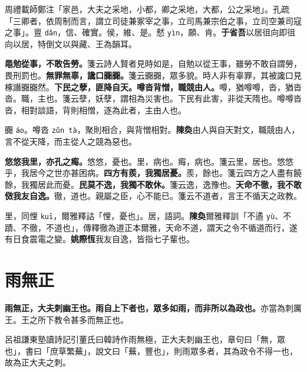 \begin{quoting}周禮載師鄭注「家邑，大夫之采地，小都，卿之采地，大都，公之采地」。孔疏「三卿者，依周制而言，謂立司徒兼冢宰之事，立司馬兼宗伯之事，立司空兼司寇之事」。亶 \texttt{dǎn}，信、確實。侯，維、是。憖 \texttt{yìn}，願、肯。\textbf{于省吾}以居徂向即徂向以居，特倒文以與藏、王為韻耳。\end{quoting}

\textbf{黽勉從事，不敢告勞。}{\footnotesize 箋云詩人賢者見時如是，自勉以從王事，雖勞不敢自謂勞，畏刑罰也。}\textbf{無罪無辜，讒口嚻嚻。}{\footnotesize 箋云嚻嚻，眾多貌。時人非有辜罪，其被讒口見椓譖嚻嚻然。}\textbf{下民之孽，匪降自天。噂沓背憎，職競由人。}{\footnotesize 噂，猶噂噂，沓，猶沓沓。職，主也。箋云孽，妖孽，謂相為災害也。下民有此害，非從天隋也。噂噂沓沓，相對談語，背則相憎，逐為此者，主由人也。}

\begin{quoting}嚻 \texttt{áo}。噂沓 \texttt{zǔn tà}，聚則相合，與背憎相對。\textbf{陳奐}由人與自天對文，職競由人，言不從天降，而主從人之競為惡也。\end{quoting}

\textbf{悠悠我里，亦孔之痗。}{\footnotesize 悠悠，憂也。里，病也。痗，病也。箋云里，居也。悠悠乎，我居今之世亦甚困病。}\textbf{四方有羨，我獨居憂。}{\footnotesize 羨，餘也。箋云四方之人盡有饒餘，我獨居此而憂。}\textbf{民莫不逸，我獨不敢休。}{\footnotesize 箋云逸，逸豫也。}\textbf{天命不徹，我不敢傚我友自逸。}{\footnotesize 徹，道也。親屬之臣，心不能已。箋云不道者，言王不循天之政教。}

\begin{quoting}里，同悝 \texttt{kuī}，爾雅釋詁「悝，憂也」。居，語詞。\textbf{陳奐}爾雅釋訓「不遹 \texttt{yù}、不蹟、不徹，不道也」，傳釋徹為道正本爾雅，天命不道，謂天之令不循道而行，遂有日食震電之變。\textbf{姚際恆}我友自逸，皆指七子輩也。\end{quoting}

\section{雨無正}


\textbf{雨無正，大夫刺幽王也。雨自上下者也，眾多如雨，而非所以為政也。}{\footnotesize 亦當為刺厲王。王之所下教令甚多而無正也。}

\begin{quoting}呂祖謙東塾讀詩記引董氏曰韓詩作雨無極，正大夫刺幽王也，章句曰「無，眾也」，書曰「庶草繁蕪」，說文曰「蕪，豐也」，則雨眾多者，其為政令不得一也，故為正大夫之刺。\end{quoting}

